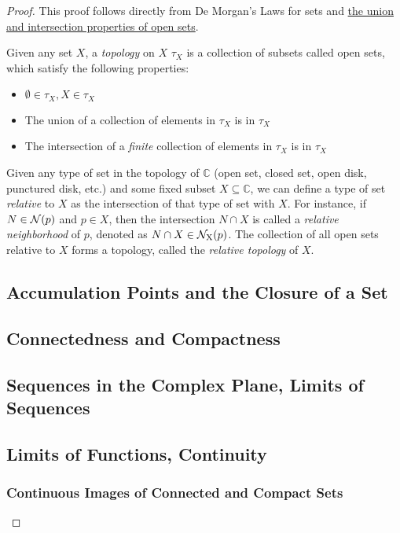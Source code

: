 \documentclass{refbook}
\begin{document}
\begin{proof}
This proof follows directly from De Morgan's Laws for sets and \hyperlink{Properties of Open Sets}{the union and intersection properties of open sets}.
\begin{definition}
Given any set $X$, a \emph{topology} on $X$ $\tau_X$ is a collection of subsets called open sets, which satisfy the following properties:
\begin{itemize}
\item $\emptyset \in \tau_X, X \in \tau_X$
\item The union of a collection of elements in $\tau_X$ is in $\tau_X$
\item The intersection of a \emph{finite} collection of elements in $\tau_X$ is in $\tau_X$
\end{itemize}
\end{definition}
\begin{definition}
Given any type of set in the topology of $\mathbb{C}$ (open set, closed set, open disk, punctured disk, etc.) and some fixed subset $X \subseteq \mathbb{C}$, we can define a type of set \emph{relative} to $X$ as the intersection of that type of set with $X$. For instance, if $N \in \nbhd{p}$ and $p \in X$, then the intersection $N \cap X$ is called a \emph{relative neighborhood} of $p$, denoted as $N \cap X \in \rnbhd{p}{X}$. The collection of all open sets relative to $X$ forms a topology, called the \emph{relative topology} of $X$.
\end{definition}
\subsection{Accumulation Points and the Closure of a Set}
\subsection{Connectedness and Compactness}
\subsection{Sequences in the Complex Plane, Limits of Sequences}
\subsection{Limits of Functions, Continuity}
\subsubsection{Continuous Images of Connected and Compact Sets}



\end{proof}
\end{document}
